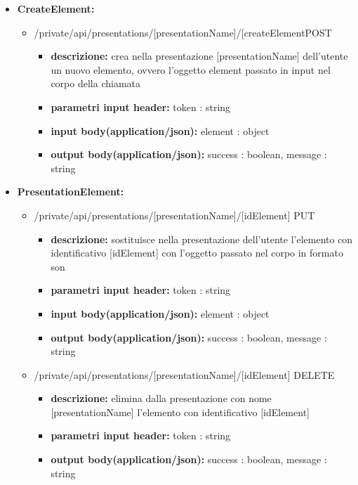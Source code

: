 {{\begin{itemize}
		\item \textbf{CreateElement:}
			\begin{itemize}
			\item   /private/api/presentations/[presentationName]/[createElementPOST
				\begin{itemize} 
				\item \textbf{descrizione:} crea nella presentazione [presentationName] dell'utente un nuovo elemento, ovvero l'oggetto element passato in input nel corpo della chiamata
				\item \textbf{parametri input header:} token : string
				\item \textbf{input body(application/json):}  element : object
				\item \textbf{output body(application/json):}  success : boolean, message : string
				\end{itemize}
			\end{itemize}
			
		\item \textbf{PresentationElement:}
			\begin{itemize}
			\item    /private/api/presentations/[presentationName]/[idElement] PUT
				\begin{itemize} 
				\item \textbf{descrizione:} sostituisce nella presentazione dell'utente l'elemento con identificativo [idElement] con l'oggetto passato nel corpo in formato son						\item \textbf{parametri input header:} token : string
				\item \textbf{input body(application/json):}  element : object
				\item \textbf{output body(application/json):}  success : boolean, message : string
				\end{itemize}
			\item    /private/api/presentations/[presentationName]/[idElement] DELETE
				\begin{itemize} 
				\item \textbf{descrizione:} elimina dalla presentazione con nome [presentationName] l'elemento con identificativo [idElement]						
				\item \textbf{parametri input header:} token : string
				\item \textbf{output body(application/json):}  success : boolean, message : string
				\end{itemize}
			\end{itemize}
			

\end{itemize}}}

